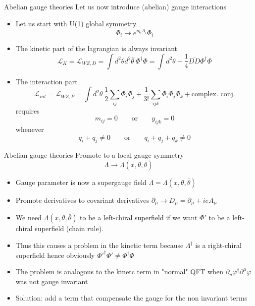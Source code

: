 \documentclass[10pt]{beamer}
\begin{document}
\begin{frame}{Abelian gauge theories}
Let us now introduce (abelian) gauge interactions
\begin{itemize} 
    \item Let us start with U(1) global symmetry 
    \begin{equation*}
        \Phi_i \rightarrow e^{iq_i\Lambda_i}\Phi_i
    \end{equation*}
    \item The kinetic part of the lagrangian is always invariant
    \begin{equation*}
        \mathcal{L}_{K} = \mathcal{L}_{WZ,D} = \int d^2\theta d^2 \bar\theta \ \Phi^{\dagger}\Phi = \int d^2\theta -\frac{1}{4} \overline{D D} \Phi^{\dagger}\Phi
    \end{equation*}
    \item The interaction part 
    \begin{equation*}
        \mathcal{L}_{int} = \mathcal{L}_{WZ,F} = \int d^2\theta \ \frac{1}{2} \sum_{ij} \Phi_i \Phi_j + \frac{1}{3!} \sum_{ijk} \Phi_i \Phi_j \Phi_k + \text{complex. conj.}
    \end{equation*}
    requires
    \begin{equation*}
        m_{ij} = 0 \qquad \text{or} \qquad y_{ijk} = 0
    \end{equation*}
    whenever
    \begin{equation*}
        q_i + q_j \neq 0 \qquad \text{or} \qquad q_i + q_j + q_k \neq 0
    \end{equation*}
\end{itemize}
\end{frame}

\begin{frame}{Abelian gauge theories}
Promote to a local gauge symmetry
\begin{equation*}
    \Lambda \to \Lambda(x, \theta, \bar\theta)
\end{equation*}
\begin{itemize}
    \item Gauge parameter is now a supergauge field $\Lambda = \Lambda(x, \theta, \bar\theta)$
    \item Promote derivatives to covariant derivatives $\partial_\mu \to D_\mu = \partial_\mu + ieA_{\mu}$
    \item We need $\Lambda(x, \theta, \bar\theta)$ to be a left-chiral superfield if we want $\Phi'$ to be a left-chiral superfield (chain rule). \\ 
    \item Thus this causes a problem in the kinetic term because $\Lambda^{\dagger}$ is a right-chiral superfield
    hence obviously $\Phi'^{\dagger}\Phi' \neq \Phi^{\dagger}\Phi$
    \item The problem is analogous to the kinetc term in "normal" QFT when $\partial_u \varphi^{\dagger} \partial^\mu \varphi$ was not gauge invariant
    \item Solution: add a term that compensate the gauge for the non invariant terms
\end{itemize}
\end{frame}
\end{document}
